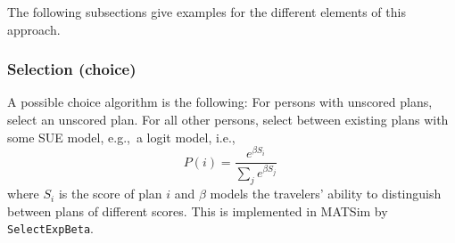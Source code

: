 The following subsections give examples for the different elements of
this approach.

\subsubsection{Selection (choice)}
\label{sec:ag-based-assignment-selection}

A possible choice algorithm is the following: For persons with
unscored plans, select an unscored plan.  For all other persons,
select between existing plans with some SUE model, e.g.,\ a logit
model, i.e.,
\begin{equation}
P(i) = \frac{e^{\beta S_i}}{\sum_j e^{\beta S_j}} \
\label{eq:2}
\end{equation}
where $S_i$ is the score of plan $i$ and $\beta$ models the
travelers' ability to distinguish between plans of different
scores.
%
This is implemented in MATSim by \lstinline{SelectExpBeta}.



